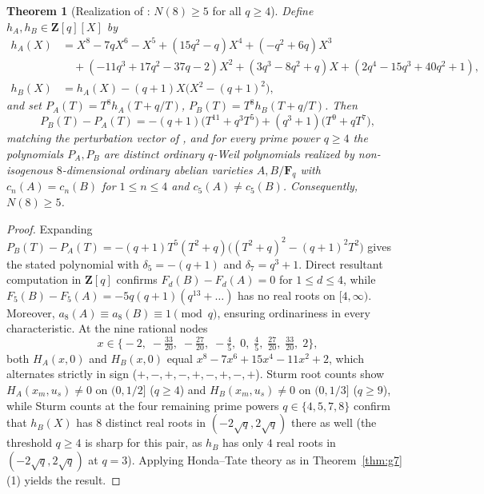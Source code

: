\documentclass[11pt]{amsart}
\newtheorem{theorem}{Theorem}[section]
\theoremstyle{remark}
\newcommand{\F}{\mathbf{F}}
\newcommand{\Z}{\mathbf{Z}}
\begin{document}
\begin{theorem}[Realization of {\cite[Remark~7.10]{CK26}}: $N(8) \ge 5$ for all $q \ge 4$]\label{thm:g8-lower}
Define $h_A, h_B \in \Z[q][X]$ by
\begin{align*}
h_A(X) &= X^8 - 7q X^6 - X^5 + (15q^2 - q) X^4 + (-q^2 + 6q) X^3 \\
       &\quad + (-11q^3 + 17q^2 - 37q - 2) X^2 + (3q^3 - 8q^2 + q) X + (2q^4 - 15q^3 + 40q^2 + 1), \\
h_B(X) &= h_A(X) - (q + 1) X\bigl(X^2 - (q + 1)^2\bigr),
\end{align*}
and set $P_A(T) = T^8 h_A(T + q/T)$, $P_B(T) = T^8 h_B(T + q/T)$. Then
\[
P_B(T) - P_A(T) = -(q + 1)\bigl(T^{11} + q^3 T^5\bigr) + (q^3 + 1)\bigl(T^9 + q T^7\bigr),
\]
matching the perturbation vector of \cite[Remark~7.10]{CK26}, and for every prime power $q \ge 4$ the polynomials $P_A, P_B$ are distinct ordinary $q$-Weil polynomials realized by non-isogenous $8$-dimensional ordinary abelian varieties $A, B / \F_q$ with $c_n(A) = c_n(B)$ for $1 \le n \le 4$ and $c_5(A) \ne c_5(B)$. Consequently, $N(8) \ge 5$.
\end{theorem}

\begin{proof}
Expanding $P_B(T) - P_A(T) = -(q + 1) T^5(T^2 + q)\bigl((T^2 + q)^2 - (q + 1)^2 T^2\bigr)$ gives the stated polynomial with $\delta_5 = -(q + 1)$ and $\delta_7 = q^3 + 1$. Direct resultant computation in $\Z[q]$ confirms $F_d(B) - F_d(A) = 0$ for $1 \le d \le 4$, while $F_5(B) - F_5(A) = -5 q(q + 1)(q^{13} + \dots)$ has no real roots on $[4, \infty)$. Moreover, $a_8(A) \equiv a_8(B) \equiv 1 \pmod{q}$, ensuring ordinariness in every characteristic. At the nine rational nodes
\[
x \in \bigl\{-2,\; -\tfrac{33}{20},\; -\tfrac{27}{20},\; -\tfrac{4}{5},\; 0,\; \tfrac{4}{5},\; \tfrac{27}{20},\; \tfrac{33}{20},\; 2\bigr\},
\]
both $H_A(x, 0)$ and $H_B(x, 0)$ equal $x^8 - 7 x^6 + 15 x^4 - 11 x^2 + 2$, which alternates strictly in sign ($+, -, +, -, +, -, +, -, +$). Sturm root counts show $H_A(x_m, u_s) \ne 0$ on $(0, 1/2]$ ($q \ge 4$) and $H_B(x_m, u_s) \ne 0$ on $(0, 1/3]$ ($q \ge 9$), while Sturm counts at the four remaining prime powers $q \in \{4, 5, 7, 8\}$ confirm that $h_B(X)$ has $8$ distinct real roots in $(-2\sqrt{q}, 2\sqrt{q})$ there as well (the threshold $q \ge 4$ is sharp for this pair, as $h_B$ has only $4$ real roots in $(-2\sqrt{q}, 2\sqrt{q})$ at $q = 3$). Applying Honda--Tate theory \cite{Tat71,How95} as in Theorem~\ref{thm:g7}(1) yields the result.
\end{proof}
\end{document}
